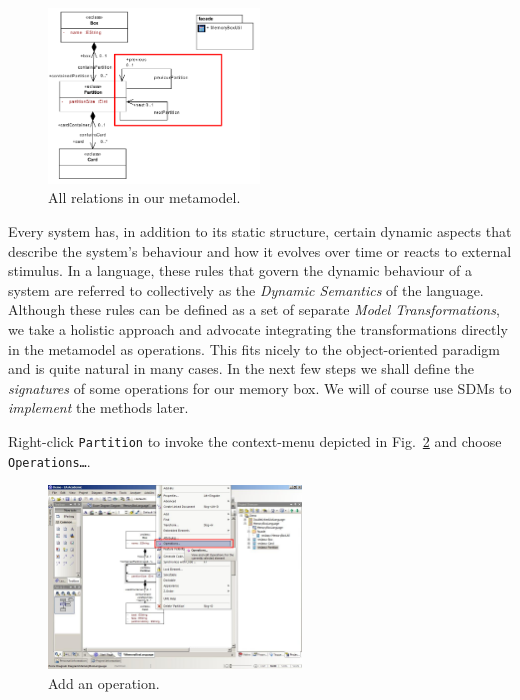 \begin{figure}[htbp]
	\centering
  \includegraphics[width=0.5\textwidth]{pics/memBoxBilder/memBox34.pdf}
	\caption{All relations in our metamodel.}
	\label{fig:ereferences_all}  
\end{figure}

\clearpage

Every system has, in addition to its static structure, certain dynamic aspects
that describe the system's behaviour and how it evolves over time or reacts to
external stimulus.
In a language, these rules that govern the dynamic behaviour of a system are
referred to collectively as the \emph{Dynamic Semantics} of the language.  
Although these rules can be defined as a set of separate \emph{Model
Transformations}, we take a holistic approach and advocate integrating the
transformations directly in the metamodel as operations.
This fits nicely to the object-oriented paradigm and is quite natural in many
cases.  In the next few steps we shall define the \emph{signatures} of some
operations for our memory box.  We will of course use SDMs to \emph{implement}
the methods later.

Right-click \texttt{Partition} to invoke the context-menu depicted in
Fig.~\ref{fig:add_operation} and choose \texttt{Operations\ldots}.

\begin{figure}[htbp]
	\centering
  \includegraphics[width=0.6\textwidth]{pics/memBoxBilder/memBox35.png}
	\caption{Add an operation.}
	\label{fig:add_operation}
\end{figure}
 
